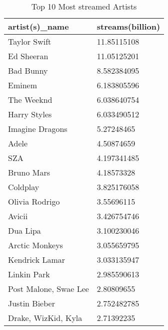 \documentclass[titlepage]{article}
\begin{document}
\begin{table}[H]
    \centering
    \caption{Top 10 Most streamed Artists}
    \begin{tabular}{ll}
    \hline
        artist(s)\_name & streams(billion) \\ \hline
        Taylor Swift & 11.85115108 \\ 
        Ed Sheeran & 11.05125201 \\ 
        Bad Bunny & 8.582384095 \\ 
        Eminem & 6.183805596 \\ 
        The Weeknd & 6.038640754 \\ 
        Harry Styles & 6.033490512 \\ 
        Imagine Dragons & 5.27248465 \\ 
        Adele & 4.50874659 \\ 
        SZA & 4.197341485 \\ 
        Bruno Mars & 4.18573328 \\ 
        Coldplay & 3.825176058 \\ 
        Olivia Rodrigo & 3.55696115 \\ 
        Avicii & 3.426754746 \\ 
        Dua Lipa & 3.100230046 \\ 
        Arctic Monkeys & 3.055659795 \\ 
        Kendrick Lamar & 3.033135947 \\ 
        Linkin Park & 2.985590613 \\ 
        Post Malone, Swae Lee & 2.80809655 \\ 
        Justin Bieber & 2.752482785 \\ 
        Drake, WizKid, Kyla & 2.71392235 \\ \hline
    \end{tabular}
\end{table}
\end{document}

